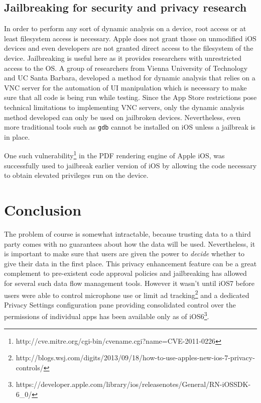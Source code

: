 \documentclass[12pt, titlepage, oneside]{article}
\begin{document}
\subsection{Jailbreaking for security and privacy research}
In order to perform any sort of dynamic analysis on a device, root access or at least filesystem access is necessary. Apple does not grant those on unmodified iOS devices and even developers are not granted direct access to the filesystem of the device. Jailbreaking is useful here as it provides researchers with unrestricted access to the OS. 
A group of researchers from Vienna University of Technology and UC Santa Barbara\cite{dynamic}, developed a method for dynamic analysis that relies on a VNC server for the automation of UI manipulation which is necessary to make sure that all code is being run while testing. Since the App Store restrictions pose technical limitations to implementing VNC servers, only the dynamic analysis method developed can only be used on jailbroken devices. Nevertheless, even more traditional tools such as \texttt{gdb} cannot be installed on iOS unless a jailbreak is in place.



One such vulnerability\footnote{http://cve.mitre.org/cgi-bin/cvename.cgi?name=CVE-2011-0226} in the PDF rendering engine of Apple iOS\cite{pios}, was successfully used to jailbreak earlier version of iOS by allowing the code necessary to obtain elevated privileges run on the device. 


\section{Conclusion}
The problem of course is somewhat intractable, because trusting data to a third party comes with no guarantees about how the data will be used. Nevertheless, it is important to make sure that users are given the power to \emph{decide} whether to give their data in the first place. This privacy enhancement feature can be a great complement to pre-existent code approval policies and jailbreaking has allowed for several such data flow management tools. However it wasn't until iOS7 before users were able to control microphone use or limit ad tracking\footnote{http://blogs.wsj.com/digits/2013/09/18/how-to-use-apples-new-ios-7-privacy-controls/} and a dedicated Privacy Settings configuration pane providing consolidated control over the permissions of individual apps has been available only as of iOS6\footnote{https://developer.apple.com/library/ios/releasenotes/General/RN-iOSSDK-6\_0/}. 


\nocite{*} 




\end{document}
